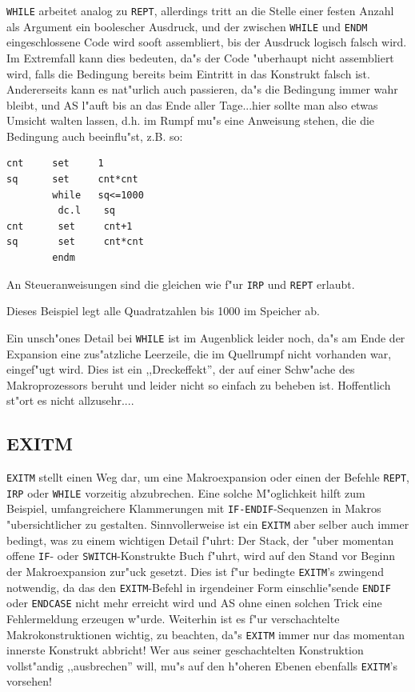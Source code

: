 \documentclass[12pt,a4paper,twoside]{report}
\makeatletter
\newcommand{\tty}[1]{{\tt #1}}
\newcommand{\ttindex}[1]{\index{#1@{\tt #1}}}
\newcommand{\asname}{AS}
\makeatother
\begin{document}
\tty{WHILE} arbeitet analog zu \tty{REPT}, allerdings tritt an die
Stelle einer festen Anzahl als Argument ein boolescher Ausdruck, und
der zwischen \tty{WHILE} und \tty{ENDM} eingeschlossene Code wird sooft
assembliert, bis der Ausdruck logisch falsch wird.  Im Extremfall kann
dies bedeuten, da"s der Code "uberhaupt nicht assembliert wird, falls die
Bedingung bereits beim Eintritt in das Konstrukt falsch ist.  Andererseits
kann es nat"urlich auch passieren, da"s die Bedingung immer wahr bleibt,
und \asname{} l"auft bis an das Ende aller Tage...hier sollte man also etwas
Umsicht walten lassen, d.h. im Rumpf mu"s eine Anweisung stehen, die die
Bedingung auch beeinflu"st, z.B. so:
\begin{verbatim}
cnt     set     1
sq      set     cnt*cnt
        while   sq<=1000
         dc.l    sq
cnt      set     cnt+1
sq       set     cnt*cnt
        endm
\end{verbatim}
An Steueranweisungen sind die gleichen wie f"ur \tty{IRP} und
\tty{REPT} erlaubt.
\par
Dieses Beispiel legt alle Quadratzahlen bis 1000 im Speicher ab.
\par
Ein unsch"ones Detail bei \tty{WHILE} ist im Augenblick leider noch,
da"s am Ende der Expansion eine zus"atzliche Leerzeile, die im Quellrumpf
nicht vorhanden war, eingef"ugt wird.  Dies ist ein ,,Dreckeffekt'',
der auf einer Schw"ache des Makroprozessors beruht und leider nicht so
einfach zu beheben ist.  Hoffentlich st"ort es nicht allzusehr....


\subsection{EXITM}
\ttindex{EXITM}

\tty{EXITM} stellt einen Weg dar, um eine Makroexpansion oder einen der
Befehle \tty{REPT}, \tty{IRP} oder \tty{WHILE} vorzeitig abzubrechen.
Eine solche M"oglichkeit hilft zum Beispiel, umfangreichere Klammerungen
mit \tty{IF-ENDIF}-Sequenzen in Makros "ubersichtlicher zu gestalten.
Sinnvollerweise ist ein \tty{EXITM} aber selber auch immer bedingt, was zu
einem wichtigen Detail f"uhrt: Der Stack, der "uber momentan offene
\tty{IF}- oder \tty{SWITCH}-Konstrukte Buch f"uhrt, wird auf den Stand vor
Beginn der Makroexpansion zur"uck gesetzt.  Dies ist f"ur bedingte
\tty{EXITM}'s zwingend notwendig, da das den \tty{EXITM}-Befehl in
irgendeiner Form einschlie"sende \tty{ENDIF} oder \tty{ENDCASE} nicht mehr
erreicht wird und \asname{} ohne einen solchen Trick eine Fehlermeldung erzeugen
w"urde.  Weiterhin ist es f"ur verschachtelte Makrokonstruktionen
wichtig, zu beachten, da"s \tty{EXITM} immer nur das momentan innerste
Konstrukt abbricht!  Wer aus seiner geschachtelten Konstruktion
vollst"andig ,,ausbrechen'' will, mu"s auf den h"oheren Ebenen ebenfalls
\tty{EXITM}'s vorsehen!
\end{document}
